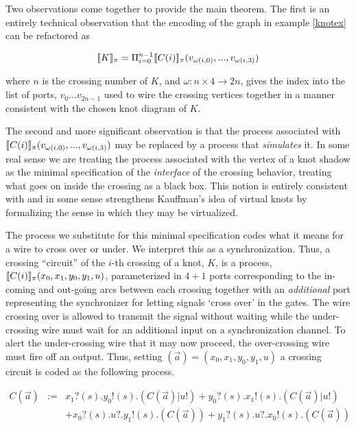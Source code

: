 \documentclass[]{llncs}
\begin{document}
Two observations come together to provide the main theorem. The first
is an entirely technical observation that the encoding of the graph in
example \ref{knotex} can be refactored as

\begin{equation}
  [\![ K ]\!]_{\pi} = \Pi_{i = 0}^{n-1} [\![ C(i) ]\!]_{\pi}(v_{\omega(i,0)},...,v_{\omega(i,3)})
\end{equation}

where $n$ is the crossing number of $K$, and $\omega: n \times 4 \to
2n$, gives the index into the list of ports, $v_0 ... v_{2n-1}$ used
to wire the crossing vertices together in a manner consistent with the
chosen knot diagram of $K$.

The second and more significant observation is that the process
associated with
$[\![ C(i) ]\!]_{\pi}(v_{\omega(i,0)},...,v_{\omega(i,3)})$ may be
replaced by a process that \emph{simulates} it. In some real sense we
are treating the process associated with the vertex of a knot shadow
as the minimal specification of the \emph{interface} of the crossing
behavior, treating what goes on inside the crossing as a black
box. This notion is entirely consistent with and in some sense
strengthens Kauffman's idea of virtual knots by formalizing the sense
in which they may be virtualized.

The process we substitute for this minimal specification codes what it
means for a wire to cross over or under. We interpret this as a
synchronization. Thus, a crossing ``circuit'' of the $i$-th crossing
of a knot, $K$, is a process,
$[\![ C(i) ]\!]_{\pi}(x_0,x_1,y_0,y_1,u)$, parameterized in $4+1$
ports corresponding to the in-coming and out-going arcs between each
crossing together with an \emph{additional} port representing the
synchronizer for letting signals `cross over' in the gates. The wire
crossing over is allowed to transmit the signal without waiting while
the under-crossing wire must wait for an additional input on a
synchronization channel. To alert the under-crossing wire that it may
now proceed, the over-crossing wire must fire off an output. Thus,
setting $(\vec{a}) = (x_0,x_1,y_0,y_1,u)$ a crossing circuit is coded
as the following process.

\begin{eqnarray}
  C(\vec{a}) & := & x_1?(s).y_0!(s).(C(\vec{a})|u!) + y_0?(s).x_1!(s).(C(\vec{a})|u!) \nonumber \\
  & & + x_0?(s).u?.y_1!(s).(C(\vec{a})) + y_1?(s).u?.x_0!(s).(C(\vec{a})) 
\end{eqnarray}
\end{document}
